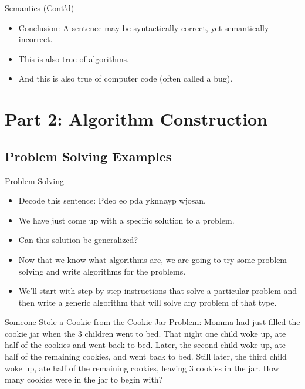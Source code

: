 \documentclass[graphics]{beamer}
\begin{document}
\begin{frame}{Semantics (Cont'd)}
    \begin{itemize}
        \item \underline{Conclusion}: A sentence may be syntactically correct, yet semantically incorrect.
        \item This is also true of algorithms.
        \item And this is also true of computer code (often called a bug).
    \end{itemize}
\end{frame}

\section{Part 2: Algorithm Construction}
\subsection{Problem Solving Examples}
\begin{frame}{Problem Solving}
    \begin{itemize}
        \item Decode this sentence: Pdeo eo pda yknnayp wjosan.
        \item We have just come up with a specific solution to a problem.
        \item Can this solution be generalized?
        \pause
        \item Now that we know what algorithms are, we are going to try some problem solving and write algorithms for the problems.
        \item We’ll start with step-by-step instructions that solve a particular problem and then write a generic algorithm that will solve any problem of that type.
    \end{itemize}
\end{frame}

\begin{frame}{Someone Stole a Cookie from the Cookie Jar}
    \underline{Problem}: Momma had just filled the cookie jar when the 3 children went to bed.  That night one child woke up, ate half of the cookies and went back to bed.  Later, the second child woke up, ate half of the remaining cookies, and went back to bed.  Still later, the third child woke up, ate half of the remaining cookies, leaving 3 cookies in the jar.  How many cookies were in the jar to begin with?
\end{frame}
\end{document}
